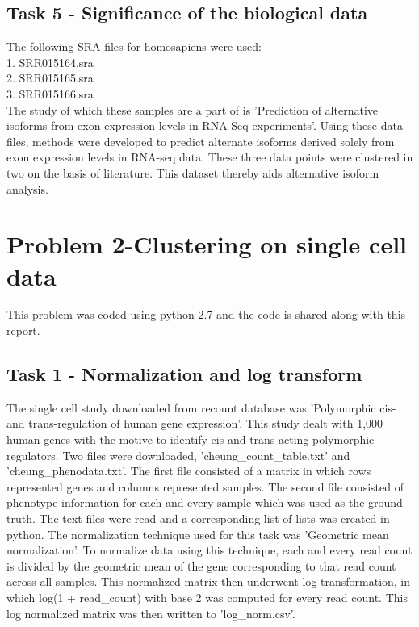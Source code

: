 \documentclass[11pt]{article}
\begin{document}
\subsection{Task 5 - Significance of the biological data}
The following SRA files for homosapiens were used:\\
1. SRR015164.sra\\
2. SRR015165.sra\\
3. SRR015166.sra\\
The study of which these samples are a part of is 'Prediction of alternative isoforms from exon expression levels in RNA-Seq experiments'. Using these data files, methods were developed to predict alternate isoforms derived solely from exon expression levels in RNA-seq data. These three data points were clustered in two on the basis of literature. This dataset thereby aids alternative isoform analysis.


\section{Problem 2-Clustering on single cell data\cite{10.1371/journal.pbio.1000480}}

This problem was coded using python 2.7 and the code is shared along with this report.

\subsection{Task 1 - Normalization and log transform}
The single cell study downloaded from recount database was 'Polymorphic cis- and trans-regulation of human gene expression'. This study dealt with 1,000 human genes with the motive to identify cis and trans acting polymorphic regulators. Two files were downloaded, 'cheung\_count\_table.txt' and 'cheung\_phenodata.txt'. The first file consisted of a matrix in which rows represented genes and columns represented samples. The second file consisted of phenotype information for each and every sample which was used as the ground truth. The text files were read and a corresponding list of lists was created in python. The normalization technique used for this task was 'Geometric mean normalization'. To normalize data using this technique, each and every read count is divided by the geometric mean of the gene corresponding to that read count across all samples. This normalized matrix then underwent log transformation, in which log(1 + read\_count) with base 2 was computed for every read count. This log normalized matrix was then written to 'log\_norm.csv'.
\end{document}
